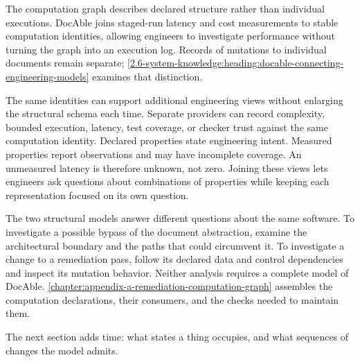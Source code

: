 
The computation graph describes declared structure rather than individual executions. DocAble joins staged-run latency and cost measurements to stable computation identities, allowing engineers to investigate performance without turning the graph into an execution log. Records of mutations to individual documents remain separate; \autoref{2.6-system-knowledge:heading:docable-connecting-engineering-models} examines that distinction.


The same identities can support additional engineering views without enlarging the structural schema each time. Separate providers can record complexity, bounded execution, latency, test coverage, or checker trust against the same computation identity. Declared properties state engineering intent. Measured properties report observations and may have incomplete coverage. An unmeasured latency is therefore unknown, not zero. Joining these views lets engineers ask questions about combinations of properties while keeping each representation focused on its own question.


The two structural models answer different questions about the same software. To investigate a possible bypass of the document abstraction, examine the architectural boundary and the paths that could circumvent it. To investigate a change to a remediation pass, follow its declared data and control dependencies and inspect its mutation behavior. Neither analysis requires a complete model of DocAble. \autoref{chapter:appendix-a-remediation-computation-graph} assembles the computation declarations, their consumers, and the checks needed to maintain them.

The next section adds time: what states a thing occupies, and what sequences of changes the model admits.
